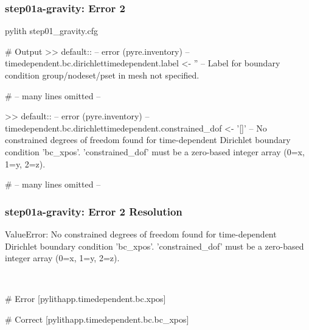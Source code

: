 \documentclass[aspectratio=169]{beamer}
\begin{document}
\begin{frame}[fragile]
  \frametitle{{\ttfamily step01a-gravity}: Error 2}

\begin{pyrejournal}
pylith step01_gravity.cfg

# Output
 >> {default}::
 -- error (pyre.inventory)
 -- timedependent.bc.dirichlettimedependent.label <- ''
 -- Label for boundary condition group/nodeset/pset in mesh not specified.

 # -- many lines omitted --

 >> {default}::
 -- error (pyre.inventory)
 -- timedependent.bc.dirichlettimedependent.constrained_dof <- '[]'
 -- No constrained degrees of freedom found for time-dependent Dirichlet boundary condition 'bc_xpos'. 'constrained_dof' must be a zero-based integer array (0=x, 1=y, 2=z).

# -- many lines omitted --
\end{pyrejournal}

\end{frame}


\begin{frame}[t,fragile]
  \frametitle{{\ttfamily step01a-gravity}: Error 2 Resolution}

  \tserror
  \begin{pyrejournal}
    ValueError: No constrained degrees of freedom found for time-dependent Dirichlet boundary condition 'bc_xpos'.
    'constrained_dof' must be a zero-based integer array (0=x, 1=y, 2=z).
  \end{pyrejournal}

  \pause\\[1pt]

  \begin{cfgcode}
    # Error
    [pylithapp.timedependent.bc.xpos]

    # Correct
    [pylithapp.timedependent.bc.bc_xpos]
  \end{cfgcode}

\end{frame}
\end{document}
